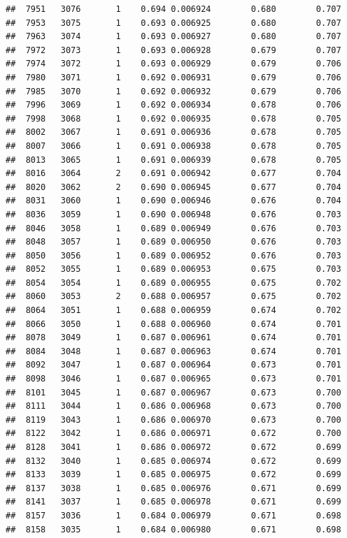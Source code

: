 \documentclass[
]{book}
\begin{document}
\begin{verbatim}
##  7951   3076       1    0.694 0.006924        0.680        0.707
##  7953   3075       1    0.693 0.006925        0.680        0.707
##  7963   3074       1    0.693 0.006927        0.680        0.707
##  7972   3073       1    0.693 0.006928        0.679        0.707
##  7974   3072       1    0.693 0.006929        0.679        0.706
##  7980   3071       1    0.692 0.006931        0.679        0.706
##  7985   3070       1    0.692 0.006932        0.679        0.706
##  7996   3069       1    0.692 0.006934        0.678        0.706
##  7998   3068       1    0.692 0.006935        0.678        0.705
##  8002   3067       1    0.691 0.006936        0.678        0.705
##  8007   3066       1    0.691 0.006938        0.678        0.705
##  8013   3065       1    0.691 0.006939        0.678        0.705
##  8016   3064       2    0.691 0.006942        0.677        0.704
##  8020   3062       2    0.690 0.006945        0.677        0.704
##  8031   3060       1    0.690 0.006946        0.676        0.704
##  8036   3059       1    0.690 0.006948        0.676        0.703
##  8046   3058       1    0.689 0.006949        0.676        0.703
##  8048   3057       1    0.689 0.006950        0.676        0.703
##  8050   3056       1    0.689 0.006952        0.676        0.703
##  8052   3055       1    0.689 0.006953        0.675        0.703
##  8054   3054       1    0.689 0.006955        0.675        0.702
##  8060   3053       2    0.688 0.006957        0.675        0.702
##  8064   3051       1    0.688 0.006959        0.674        0.702
##  8066   3050       1    0.688 0.006960        0.674        0.701
##  8078   3049       1    0.687 0.006961        0.674        0.701
##  8084   3048       1    0.687 0.006963        0.674        0.701
##  8092   3047       1    0.687 0.006964        0.673        0.701
##  8098   3046       1    0.687 0.006965        0.673        0.701
##  8101   3045       1    0.687 0.006967        0.673        0.700
##  8111   3044       1    0.686 0.006968        0.673        0.700
##  8119   3043       1    0.686 0.006970        0.673        0.700
##  8122   3042       1    0.686 0.006971        0.672        0.700
##  8128   3041       1    0.686 0.006972        0.672        0.699
##  8132   3040       1    0.685 0.006974        0.672        0.699
##  8133   3039       1    0.685 0.006975        0.672        0.699
##  8137   3038       1    0.685 0.006976        0.671        0.699
##  8141   3037       1    0.685 0.006978        0.671        0.699
##  8157   3036       1    0.684 0.006979        0.671        0.698
##  8158   3035       1    0.684 0.006980        0.671        0.698

\end{verbatim}
\end{document}
